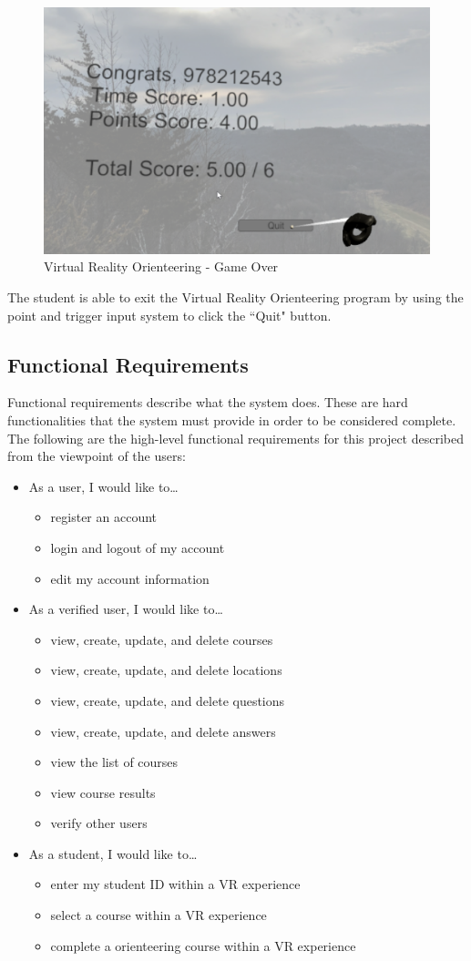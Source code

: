 \begin{figure}[htb]
	\centering
	\includegraphics[width=.5\textwidth]{Requirements/assets/vr-game-over.png}
	\caption[Virtual Reality Orienteering - Game Over]{\label{VR Game Over}Virtual Reality Orienteering - Game Over}
\end{figure} 
The student is able to exit the Virtual Reality Orienteering program by using the point and trigger input system to click the ``Quit" button.
\subsection{Functional Requirements}
Functional requirements describe what the system does. These are hard functionalities that the system must provide in order to be considered complete. The following are the high-level functional requirements for this project described from the viewpoint of the users:
\begin{itemize}
	\item As a user, I would like to\ldots
	\begin{itemize}
		\item register an account
		\item login and logout of my account
		\item edit my account information
	\end{itemize}
	\item As a verified user, I would like to\ldots
	\begin{itemize}
		\item view, create, update, and delete courses
		\item view, create, update, and delete locations
		\item view, create, update, and delete questions
		\item view, create, update, and delete answers
		\item view the list of courses
		\item view course results
		\item verify other users
	\end{itemize}
	\item As a student, I would like to\ldots
	\begin{itemize}
		\item enter my student ID  within a VR experience
		\item select a course within a VR experience
		\item complete a orienteering course within a VR experience
	\end{itemize}
\end{itemize}

